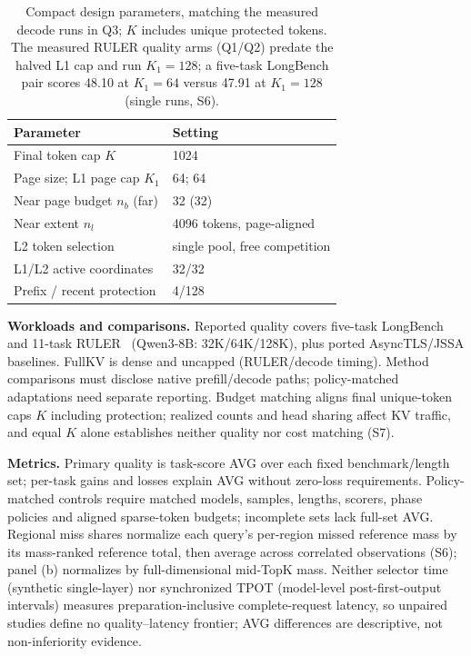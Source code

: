 \documentclass[conference,9pt,letterpaper]{IEEEtran}
\begin{document}
\begin{table}[t]\centering\small
\caption{Compact design parameters, matching the measured decode runs in Q3; $K$ includes unique protected tokens. The measured RULER quality arms (Q1/Q2) predate the halved L1 cap and run $K_1{=}128$; a five-task LongBench pair scores 48.10 at $K_1{=}64$ versus 47.91 at $K_1{=}128$ (single runs, S6).}\label{tab:settings}
\begin{tabular}{ll}\hline
Parameter & Setting \\\hline
Final token cap $K$ & 1024 \\
Page size; L1 page cap $K_1$ & 64; 64 \\
Near page budget $n_b$ (far) & 32 (32) \\
Near extent $n_l$ & 4096 tokens, page-aligned \\
L2 token selection & single pool, free competition \\
L1/L2 active coordinates & 32/32 \\
Prefix / recent protection & 4/128 \\\hline
\end{tabular}\end{table}

\textbf{Workloads and comparisons.} Reported quality covers five-task LongBench~\cite{longbench} and 11-task RULER~\cite{ruler} (Qwen3-8B: 32K/64K/128K), plus ported AsyncTLS/JSSA baselines. FullKV is dense and uncapped (RULER/decode timing). Method comparisons must disclose native prefill/decode paths; policy-matched adaptations need separate reporting. Budget matching aligns final unique-token caps $K$ including protection; realized counts and head sharing affect KV traffic, and equal $K$ alone establishes neither quality nor cost matching (S7).

\textbf{Metrics.} Primary quality is task-score AVG over each fixed benchmark/length set; per-task gains and losses explain AVG without zero-loss requirements. Policy-matched controls require matched models, samples, lengths, scorers, phase policies and aligned sparse-token budgets; incomplete sets lack full-set AVG. Regional miss shares normalize each query's per-region missed reference mass by its mass-ranked reference total, then average across correlated observations (S6); panel (b) normalizes by full-dimensional mid-TopK mass. Neither selector time (synthetic single-layer) nor synchronized TPOT (model-level post-first-output intervals) measures preparation-inclusive complete-request latency, so unpaired studies define no quality--latency frontier; AVG differences are descriptive, not non-inferiority evidence.
\end{document}
